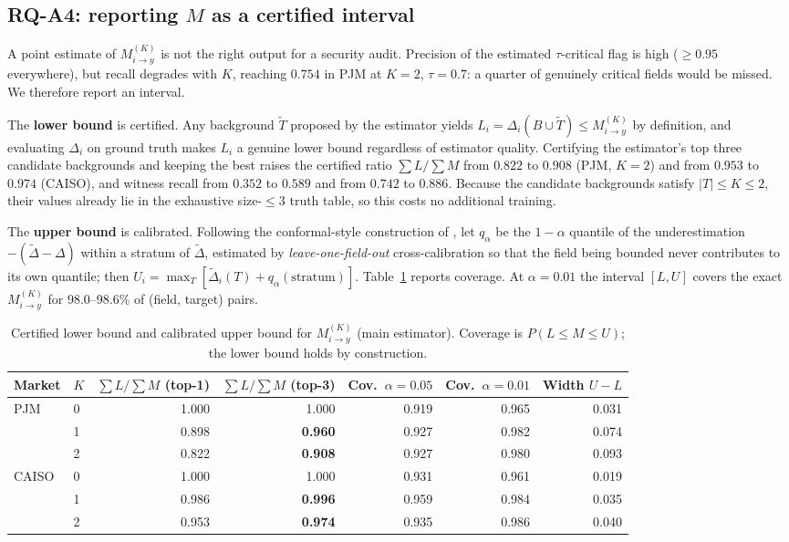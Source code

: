 \documentclass[preprint,12pt]{elsarticle}
\newcommand{\Mik}{M^{(K)}_{i \to y}}
\begin{document}
\subsection{RQ-A4: reporting $M$ as a certified interval}\label{sec:interval}
A point estimate of $\Mik$ is not the right output for a security audit. Precision of the
estimated $\tau$-critical flag is high ($\ge 0.95$ everywhere), but recall degrades with $K$,
reaching $0.754$ in PJM at $K=2$, $\tau=0.7$: a quarter of genuinely critical fields would be
missed. We therefore report an interval.

The \textbf{lower bound} is certified. Any background $\tilde T$ proposed by the estimator
yields $L_i = \Delta_i(B\cup\tilde T) \le \Mik$ by definition, and evaluating $\Delta_i$ on
ground truth makes $L_i$ a genuine lower bound regardless of estimator quality. Certifying
the estimator's top three candidate backgrounds and keeping the best raises the certified
ratio $\sum L/\sum M$ from $0.822$ to $0.908$ (PJM, $K=2$) and from $0.953$ to $0.974$
(CAISO), and witness recall from $0.352$ to $0.589$ and from $0.742$ to $0.886$. Because the
candidate backgrounds satisfy $|T|\le K\le 2$, their values already lie in the exhaustive
size-$\le 3$ truth table, so this costs no additional training.

The \textbf{upper bound} is calibrated. Following the conformal-style construction of
\cite{vovk2005conformal}, let $q_\alpha$ be the $1-\alpha$ quantile of the underestimation
$-(\tilde\Delta-\Delta)$ within a stratum of $\tilde\Delta$, estimated by
\emph{leave-one-field-out} cross-calibration so that the field being bounded never
contributes to its own quantile; then $U_i=\max_T[\tilde\Delta_i(T)+q_\alpha(\text{stratum})]$.
Table~\ref{tab:interval} reports coverage. At $\alpha=0.01$ the interval $[L,U]$ covers the
exact $\Mik$ for 98.0--98.6\% of (field, target) pairs.

\begin{table}[t]
\centering
\caption{Certified lower bound and calibrated upper bound for $\Mik$ (main estimator).
Coverage is $P(L \le M \le U)$; the lower bound holds by construction.}
\label{tab:interval}
\small
\begin{tabular}{llrrrrr}
\toprule
Market & $K$ & $\sum L/\sum M$ (top-1) & $\sum L/\sum M$ (top-3) &
Cov.\ $\alpha{=}0.05$ & Cov.\ $\alpha{=}0.01$ & Width $U-L$ \\
\midrule
\multirow{3}{*}{PJM}
 & 0 & 1.000 & 1.000 & 0.919 & 0.965 & 0.031 \\
 & 1 & 0.898 & \textbf{0.960} & 0.927 & 0.982 & 0.074 \\
 & 2 & 0.822 & \textbf{0.908} & 0.927 & 0.980 & 0.093 \\
\midrule
\multirow{3}{*}{CAISO}
 & 0 & 1.000 & 1.000 & 0.931 & 0.961 & 0.019 \\
 & 1 & 0.986 & \textbf{0.996} & 0.959 & 0.984 & 0.035 \\
 & 2 & 0.953 & \textbf{0.974} & 0.935 & 0.986 & 0.040 \\
\bottomrule
\end{tabular}
\end{table}
\end{document}
